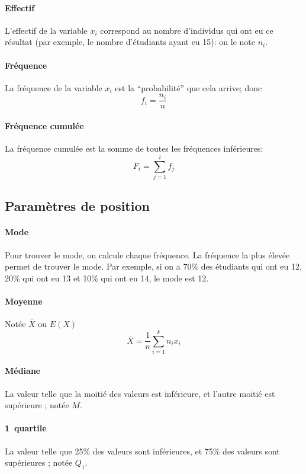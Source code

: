 \documentclass[10pt,a4paper,french]{article}
\begin{document}
\paragraph{Effectif}
L'effectif de la variable $x_i$ correspond au nombre d'individus qui ont eu ce résultat (par exemple, le nombre d'étudiants ayant eu 15): on le note $n_i$.

\paragraph{Fréquence}
La fréquence de la variable $x_i$ est la ``probabilité'' que cela arrive; donc \[ f_i = \frac{n_i}{n} \]

\paragraph{Fréquence cumulée}
La fréquence cumulée est la somme de toutes les fréquences inférieures: \[ F_i = \sum_{j=1}^i f_j \]

\subsection{Paramètres de position}

\paragraph{Mode}
Pour trouver le mode, on calcule chaque fréquence. La fréquence la plus élevée permet de trouver le mode. Par exemple, si on a 70\% des étudiants qui ont eu 12, 20\% qui ont eu 13 et 10\% qui ont eu 14, le mode est 12.

\paragraph{Moyenne}
Notée $\overline{X}$ ou $E(X)$ \[ \overline{X} = \frac{1}{n} \sum_{i=1}^k n_i x_i \]

\paragraph{Médiane}
La valeur telle que la moitié des valeurs est inférieure, et l'autre moitié est supérieure ; notée $M$.

\paragraph{1\ier~quartile}
La valeur telle que 25\% des valeurs sont inférieures, et 75\% des valeurs sont supérieures ; notée $Q_1$.
\end{document}
